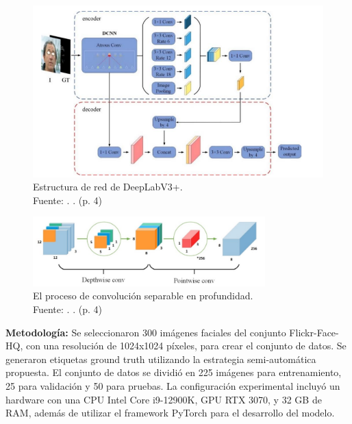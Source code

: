 \begin{figure}[!ht]
	\begin{center}
		\includegraphics[width=1\textwidth]{2/figures/Meto1.png}
		\caption[Estructura de red de DeepLabV3+]{Estructura de red de DeepLabV3+.\\
			Fuente: \cite{Zhong2024}. . (p. 4)}
		\label{2:fig4}
	\end{center}
\end{figure}


\begin{figure}[!ht]
	\begin{center}
		\includegraphics[width=0.80\textwidth]{2/figures/Meto2.png}
		\caption[El proceso de convolución separable en profundidad]{El proceso de convolución separable en profundidad.\\
			Fuente: \cite{Zhong2024}. . (p. 4)}
		\label{2:fig5}
	\end{center}
\end{figure}


\textbf{Metodología:}
Se seleccionaron 300 imágenes faciales del conjunto Flickr-Face-HQ, con una resolución de 1024x1024 píxeles, para crear el conjunto de datos. Se generaron etiquetas ground truth utilizando la estrategia semi-automática propuesta. El conjunto de datos se dividió en 225 imágenes para entrenamiento, 25 para validación y 50 para pruebas. La configuración experimental incluyó un hardware con una CPU Intel Core i9-12900K, GPU RTX 3070, y 32 GB de RAM, además de utilizar el framework PyTorch para el desarrollo del modelo.

